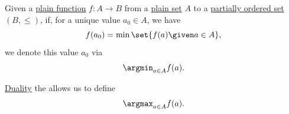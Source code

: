 \begin{definition}\label{def:argmin_argmax}
  Given a \hyperref[def:function]{plain function} \( f: A \to B \) from a \hyperref[def:set]{plain set} \( A \) to a \hyperref[def:partially_ordered_set]{partially ordered set} \( (B, \leq) \), if, for a unique value \( a_0 \in A \), we have
  \begin{equation*}
    f(a_0) = \min\set{ f(a) \given a \in A },
  \end{equation*}
  we denote this value \( a_0 \) via
  \begin{equation*}
    \argmin_{a \in A} f(a).
  \end{equation*}

  \hyperref[thm:order_duality]{Duality} the allows us to define
  \begin{equation*}
    \argmax_{a \in A} f(a).
  \end{equation*}
\end{definition}


